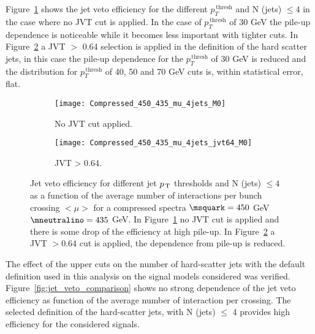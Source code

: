 Figure~\ref{fig:comp_4jets_nojvt} shows the jet veto efficiency for the
different $p_T^{\mathrm{\, thresh}}$ and N (jets) $\leq 4$ in the case where no
JVT cut is applied. In the case of $p_T^{\mathrm{\, thresh}}$ of 30 GeV the
pile-up dependence is noticeable while it becomes less important with tighter
cuts. In Figure~\ref{fig:comp_4jets_jvt64} a JVT $>$ 0.64 selection is applied
in the definition of the hard scatter jets, in this case the pile-up dependence
for the $p_T^{\mathrm{\, thresh}}$ of 30 GeV is reduced and the distribution for
$p_T^{\mathrm{\, thresh}}$ of 40, 50 and 70 GeV cuts is, within statistical
error, flat.
\begin{figure}[!h]
  \centering
  \begin{subfigure}[t]{.48\linewidth}
    \texttt{[image: Compressed\_450\_435\_mu\_4jets\_M0]}
    \caption{No JVT cut applied.}
    \label{fig:comp_4jets_nojvt}
  \end{subfigure}
  \begin{subfigure}[t]{.48\linewidth}
    \texttt{[image: Compressed\_450\_435\_mu\_4jets\_jvt64\_M0]}
    \caption{JVT > 0.64.}
    \label{fig:comp_4jets_jvt64}
  \end{subfigure}
  \caption{Jet veto efficiency for different jet $p_\mathrm{\, T}$ thresholds and N (jets)
    $\leq 4$ as a function of the average number of interactions per bunch
    crossing $<\mu>$ for a compressed spectra $\msquark = 450$ GeV
    $\mneutralino = 435$ GeV. In Figure~\ref{fig:comp_4jets_nojvt} no JVT cut is
    applied and there is some drop of the efficiency at high pile-up. In
    Figure~\ref{fig:comp_4jets_jvt64} a JVT $> 0.64$ cut is applied, the
    dependence from pile-up is reduced.}
  \label{fig:comp_eff}
\end{figure}

The effect of the upper cuts on the number of hard-scatter jets with the default
definition used in this analysis on the signal models considered was
verified. Figure~\ref{fig:jet_veto_comparison} shows no strong dependence of the
jet veto efficiency as function of the average number of interaction per
crossing. The selected definition of the hard-scatter jets, with N (jets) $\leq$
4 provides high efficiency for the considered signals.

